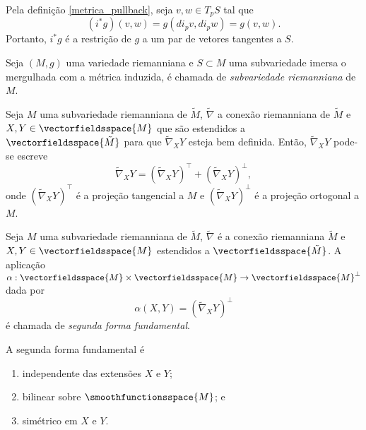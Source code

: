 \begin{observacao}
	Pela definição \ref{metrica_pullback}, seja $v,w \in T_p S$ tal que
	\begin{equation*}
	(i^* g)(v,w) = g(di_p v, di_p w) = g(v,w). 
	\end{equation*}
	Portanto, $i^* g$ é a restrição de $g$ a um par de vetores tangentes a $S$. 
\end{observacao}



\begin{definicao}
	Seja $(M,g)$ uma variedade riemanniana e $S \subset M$ uma subvariedade imersa o mergulhada com a métrica induzida, é chamada de \emph{subvariedade riemanniana} de $M$.
\end{definicao}

\begin{observacao}
	Seja $M$ uma subvariedade riemanniana de $\tilde{M}$,
	$\tilde{\nabla}$ a conexão riemanniana de $\tilde{M}$ e 
	$X,Y \in \vectorfieldsspace{M}$ que são estendidos a $\vectorfieldsspace{\tilde{M}}$ para que $\tilde{\nabla}_X Y$ esteja bem definida.
	Então, $\tilde{\nabla}_X Y$ pode-se escreve
	\begin{equation*}
	\tilde{\nabla}_X Y = \left(\tilde{\nabla}_X Y\right)^\top + \left(\tilde{\nabla}_X Y\right)^\perp,
	\end{equation*}
	onde $\left(\tilde{\nabla}_X Y\right)^\top$ é a projeção tangencial a $M$ e $\left(\tilde{\nabla}_X Y\right)^\perp$ é a projeção ortogonal a $M$.
\end{observacao}

\begin{definicao}
	Seja $M$ uma subvariedade riemanniana de $\tilde{M}$,
	$\tilde{\nabla}$ é a conexão riemanniana $\tilde{M}$ e
	$X,Y \in \vectorfieldsspace{M}$ estendidos a $\vectorfieldsspace{\tilde{M}}$.
	A aplicação $\alpha: \vectorfieldsspace{M} \times \vectorfieldsspace{M} \rightarrow \vectorfieldsspace{M}^\perp$ dada por
	\begin{equation*}
		\alpha(X,Y) = (\tilde{\nabla}_X Y)^\perp
	\end{equation*} 
	é chamada de \emph{segunda forma fundamental}.
\end{definicao}

\begin{proposicao}
	A segunda forma fundamental é
	\begin{enumerate}
		\item independente das extensões $X$ e $Y$;
		\item bilinear sobre $\smoothfunctionsspace{M}$; e
		\item simétrico em $X$ e $Y$.
	\end{enumerate}
\end{proposicao}

